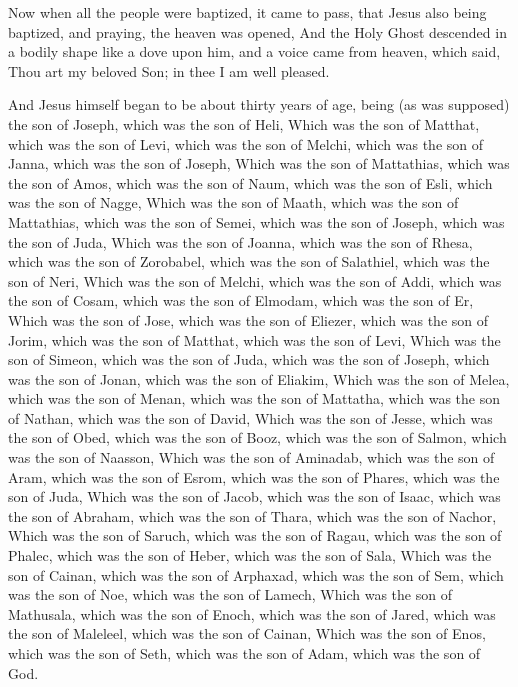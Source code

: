 \Verse Now when all the people were baptized, it came to pass, that Jesus also being baptized, and praying, the heaven was opened, \Verse And the Holy Ghost descended in a bodily shape like a dove upon him, and a voice came from heaven, which said, Thou art my beloved Son; in thee I am well pleased.

\Verse And Jesus himself began to be about thirty years of age, being (as was supposed) the son of Joseph, which was the son of Heli, \Verse Which was the son of Matthat, which was the son of Levi, which was the son of Melchi, which was the son of Janna, which was the son of Joseph, \Verse Which was the son of Mattathias, which was the son of Amos, which was the son of Naum, which was the son of Esli, which was the son of Nagge, \Verse Which was the son of Maath, which was the son of Mattathias, which was the son of Semei, which was the son of Joseph, which was the son of Juda, \Verse Which was the son of Joanna, which was the son of Rhesa, which was the son of Zorobabel, which was the son of Salathiel, which was the son of Neri, \Verse Which was the son of Melchi, which was the son of Addi, which was the son of Cosam, which was the son of Elmodam, which was the son of Er, \Verse Which was the son of Jose, which was the son of Eliezer, which was the son of Jorim, which was the son of Matthat, which was the son of Levi, \Verse Which was the son of Simeon, which was the son of Juda, which was the son of Joseph, which was the son of Jonan, which was the son of Eliakim, \Verse Which was the son of Melea, which was the son of Menan, which was the son of Mattatha, which was the son of Nathan, which was the son of David, \Verse Which was the son of Jesse, which was the son of Obed, which was the son of Booz, which was the son of Salmon, which was the son of Naasson, \Verse Which was the son of Aminadab, which was the son of Aram, which was the son of Esrom, which was the son of Phares, which was the son of Juda, \Verse Which was the son of Jacob, which was the son of Isaac, which was the son of Abraham, which was the son of Thara, which was the son of Nachor, \Verse Which was the son of Saruch, which was the son of Ragau, which was the son of Phalec, which was the son of Heber, which was the son of Sala, \Verse Which was the son of Cainan, which was the son of Arphaxad, which was the son of Sem, which was the son of Noe, which was the son of Lamech, \Verse Which was the son of Mathusala, which was the son of Enoch, which was the son of Jared, which was the son of Maleleel, which was the son of Cainan, \Verse Which was the son of Enos, which was the son of Seth, which was the son of Adam, which was the son of God.


